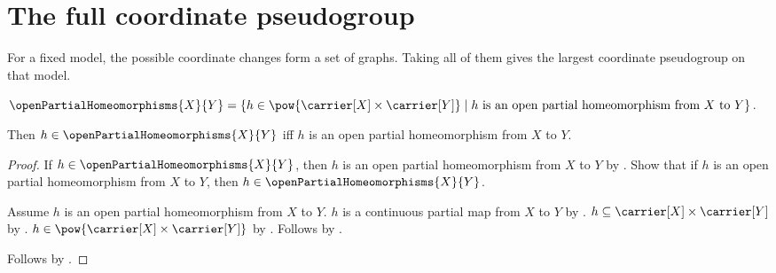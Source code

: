 \section{The full coordinate pseudogroup}



For a fixed model, the possible coordinate changes form a set of graphs.
Taking all of them gives the largest coordinate pseudogroup on that model.

\begin{definition}\label{open_partial_homeomorphisms}
    $\openPartialHomeomorphisms{X}{Y}=
        \{h\in\pow{\carrier[X]\times\carrier[Y]}\mid
            \text{$h$ is an open partial homeomorphism from $X$ to $Y$}\}$.
\end{definition}

\begin{theorem}\label{open_partial_homeomorphisms_iff}
    Then $h\in\openPartialHomeomorphisms{X}{Y}$ iff
        $h$ is an open partial homeomorphism from $X$ to $Y$.
\end{theorem}
\begin{proof}
    If $h\in\openPartialHomeomorphisms{X}{Y}$, then
        $h$ is an open partial homeomorphism from $X$ to $Y$ by
        .
    Show that if $h$ is an open partial homeomorphism from $X$ to $Y$,
        then $h\in\openPartialHomeomorphisms{X}{Y}$.
    \begin{subproof}
        Assume $h$ is an open partial homeomorphism from $X$ to $Y$.
        $h$ is a continuous partial map from $X$ to $Y$ by
            .
        $h\subseteq\carrier[X]\times\carrier[Y]$ by
            .
        $h\in\pow{\carrier[X]\times\carrier[Y]}$ by .
        Follows by .
    \end{subproof}
    Follows by \auto.
\end{proof}

